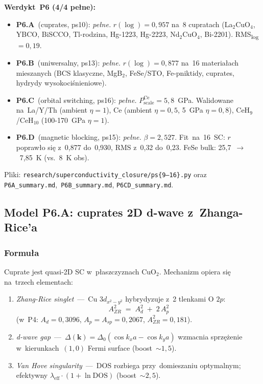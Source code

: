 \medskip\noindent\textbf{Werdykt~P6 (4/4 pe\l{}ne):}
\begin{itemize}\itemsep0pt
  \item \textbf{P6.A}~(cuprates, ps10): \emph{pe\l{}ne.}
    $r(\log)=0{,}957$ na~8 cupratach
    (La$_2$CuO$_4$, YBCO, BiSCCO, Tl-rodzina, Hg-1223, Hg-2223,
    Nd$_2$CuO$_4$, Bi-2201). RMS\textsubscript{log}$=0{,}19$.
  \item \textbf{P6.B}~(uniwersalny, ps13): \emph{pe\l{}ne.}
    $r(\log)=0{,}877$ na~16 materia\l{}ach mieszanych
    (BCS klasyczne, MgB${}_2$, FeSe/STO, Fe-pniktidy, cuprates,
    hydrydy wysokoci\'snieniowe).
  \item \textbf{P6.C}~(orbital switching, ps16): \emph{pe\l{}ne.}
    $P_\text{scale}^\text{Ce}=5{,}8$~GPa. Walidowane na~La/Y/Th
    (ambient $\eta\!=\!1$), Ce (ambient $\eta\!=\!0{,}5$,
    5~GPa $\eta\!=\!0{,}8$), CeH$_9$/CeH$_{10}$ (100-170~GPa $\eta\!=\!1$).
  \item \textbf{P6.D}~(magnetic blocking, ps15): \emph{pe\l{}ne.}
    $\beta=2{,}527$. Fit~na~16~SC: $r$ popraw\l{}o si\k{e} z~0{,}877 do~0{,}930,
    RMS z~0{,}32 do~0{,}23. FeSe bulk: 25{,}7~$\to$~7{,}85~K (vs.~8~K obs).
\end{itemize}

Pliki: \texttt{research/superconductivity\_closure/ps\{9--16\}.py}
oraz \texttt{P6A\_summary.md},~\texttt{P6B\_summary.md},
\texttt{P6CD\_summary.md}.

\subsection{Model P6.A: cuprates 2D d-wave z~Zhanga-Rice'a}
\label{sec:P6A}

\subsubsection{Formu\l{}a}

Cuprate jest quasi-2D SC w~p\l{}aszczyznach CuO${}_2$. Mechanizm
opiera si\k{e} na~trzech elementach:

\begin{enumerate}\itemsep0pt
  \item \emph{Zhang-Rice singlet}~---~Cu $3d_{x^2-y^2}$ hybrydyzuje
    z~2 tlenkami O $2p$:
    \[
      A_{ZR}^2 \;=\; A_d^2 \;+\; 2\,A_p^2
    \]
    (w~P4: $A_d=0{,}3096$, $A_p=A_{sp}=0{,}2067$, $A_{ZR}^2=0{,}181$).
  \item \emph{d-wave gap}~---~$\Delta(\mathbf{k})=\Delta_0(\cos k_x a
    -\cos k_y a)$ wzmacnia sprz\k{e}\.zenie w~kierunkach~$(1,0)$ Fermi
    surface (boost~$\sim 1{,}5$).
  \item \emph{Van Hove singularity}~---~DOS rozbiega przy~domieszaniu
    optymalnym; efektywny $\lambda_\text{eff}\cdot (1+\ln \mathrm{DOS})$
    (boost~$\sim 2{,}5$).
\end{enumerate}


